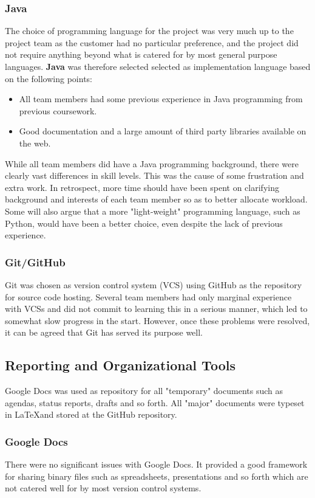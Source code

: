 \subsubsection{Java}
The choice of programming language for the project was very much up to the
project team as the customer had no particular preference, and the
project did not require anything beyond what is catered for by most
general purpose languages. \textbf{Java} was therefore selected 
selected as implementation language based on the following points:

\begin{itemize}
\item All team members had some previous experience in Java
  programming from previous coursework.
\item Good documentation and a large amount of third party libraries
  available on the web.
\end{itemize}

While all team members did have a Java programming background, there
were clearly vast differences in skill levels. This was the cause of
some frustration and extra work. In retrospect, more time should have been spent
on clarifying background and interests of each team member so as to
better allocate workload. Some will also argue that a more
"light-weight" programming language, such as Python, would have been a
better choice, even despite the lack of previous experience.

\subsubsection{Git/GitHub}
Git was chosen as version control system (VCS) using GitHub as 
the repository for source code hosting. Several team members had only marginal experience with
VCSs and did not commit to learning this in a serious manner, which
led to somewhat slow progress in the start. However, once these problems
were resolved, it can be agreed that Git has served its purpose well.


\subsection{Reporting and Organizational Tools}
Google Docs was used as repository for all "temporary" documents such
as agendas, status reports, drafts and so forth. All "major"
documents were typeset in \LaTeX and stored at the GitHub repository.

\subsubsection{Google Docs}
There were no significant issues with Google Docs. It provided a good
framework for sharing binary files such as spreadsheets, presentations and so forth which
are not catered well for by most version control systems.


